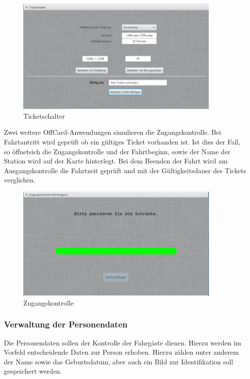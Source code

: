 \documentclass[	a4paper,
			11pt,
			oneside,
			parskip]{scrartcl}
\begin{document}
\begin{figure}[H]
	\centering
  	\includegraphics[width=0.9\textwidth]{img/ticket}
	\caption{Ticketschalter}
	\label{ticketoff}
\end{figure}

Zwei weitere OffCard-Anwendungen simulieren die Zugangskontrolle. Bei Fahrtantritt wird geprüft ob ein gültiges Ticket vorhanden ist. Ist dies der Fall, so \glqq öffnet\grqq sich die Zugangskontrolle und der Fahrtbeginn, sowie der Name der Station wird auf der Karte hinterlegt. Bei dem Beenden der Fahrt wird am Ausgangskontrolle die Fahrtzeit geprüft und mit der Gültigkeitsdauer des Tickets verglichen.

\begin{figure}[H]
	\centering
  	\includegraphics[width=0.9\textwidth]{img/gate}
	\caption{Zugangskontrolle}
	\label{gateoff}
\end{figure}

\subsubsection{Verwaltung der Personendaten}

Die Personendaten sollen der Kontrolle der Fahrgäste dienen. Hierzu werden im Vorfeld entscheidende Daten zur Person erhoben. Hierzu zählen unter anderem der Name sowie das Geburtsdatum, aber auch ein Bild zur Identifikation soll gespeichert werden.
\end{document}
